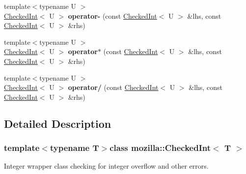 \begin{DoxyCompactItemize}
\item 
\hypertarget{classmozilla_1_1_checked_int_aaa598c2ed27abd8fad5f65dff8c5c46b}{{\footnotesize template$<$typename U $>$ }\\\hyperlink{classmozilla_1_1_checked_int}{Checked\-Int}$<$ U $>$ {\bfseries operator-\/} (const \hyperlink{classmozilla_1_1_checked_int}{Checked\-Int}$<$ U $>$ \&lhs, const \hyperlink{classmozilla_1_1_checked_int}{Checked\-Int}$<$ U $>$ \&rhs)}\label{classmozilla_1_1_checked_int_aaa598c2ed27abd8fad5f65dff8c5c46b}

\item 
\hypertarget{classmozilla_1_1_checked_int_a94e1ed12e88299128402485ff53f236f}{{\footnotesize template$<$typename U $>$ }\\\hyperlink{classmozilla_1_1_checked_int}{Checked\-Int}$<$ U $>$ {\bfseries operator$\ast$} (const \hyperlink{classmozilla_1_1_checked_int}{Checked\-Int}$<$ U $>$ \&lhs, const \hyperlink{classmozilla_1_1_checked_int}{Checked\-Int}$<$ U $>$ \&rhs)}\label{classmozilla_1_1_checked_int_a94e1ed12e88299128402485ff53f236f}

\item 
\hypertarget{classmozilla_1_1_checked_int_af275f2e36d8227629d9520a0bdac26ca}{{\footnotesize template$<$typename U $>$ }\\\hyperlink{classmozilla_1_1_checked_int}{Checked\-Int}$<$ U $>$ {\bfseries operator/} (const \hyperlink{classmozilla_1_1_checked_int}{Checked\-Int}$<$ U $>$ \&lhs, const \hyperlink{classmozilla_1_1_checked_int}{Checked\-Int}$<$ U $>$ \&rhs)}\label{classmozilla_1_1_checked_int_af275f2e36d8227629d9520a0bdac26ca}

\end{DoxyCompactItemize}


\subsection{Detailed Description}
\subsubsection*{template$<$typename T$>$class mozilla\-::\-Checked\-Int$<$ T $>$}

Integer wrapper class checking for integer overflow and other errors. 


